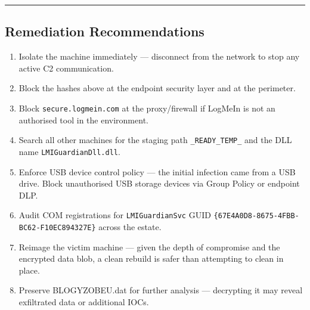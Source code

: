 \documentclass[
]{article}
\providecommand{\tightlist}{%
  \setlength{\itemsep}{0pt}\setlength{\parskip}{0pt}}
\begin{document}
\begin{center}\rule{0.5\linewidth}{0.5pt}\end{center}

\subsection{Remediation
Recommendations}\label{remediation-recommendations}

\begin{enumerate}
\def\labelenumi{\arabic{enumi}.}
\tightlist
\item
  Isolate the machine immediately --- disconnect from the network to
  stop any active C2 communication.
\item
  Block the hashes above at the endpoint security layer and at the
  perimeter.
\item
  Block \texttt{secure.logmein.com} at the proxy/firewall if LogMeIn is
  not an authorised tool in the environment.
\item
  Search all other machines for the staging path
  \texttt{\_READY\_TEMP\_} and the DLL name \texttt{LMIGuardianDll.dll}.
\item
  Enforce USB device control policy --- the initial infection came from
  a USB drive. Block unauthorised USB storage devices via Group Policy
  or endpoint DLP.
\item
  Audit COM registrations for \texttt{LMIGuardianSvc} GUID
  \texttt{\{67E4A0D8-8675-4FBB-BC62-F10EC894327E\}} across the estate.
\item
  Reimage the victim machine --- given the depth of compromise and the
  encrypted data blob, a clean rebuild is safer than attempting to clean
  in place.
\item
  Preserve BLOGYZOBEU.dat for further analysis --- decrypting it may
  reveal exfiltrated data or additional IOCs.
\end{enumerate}
\end{document}
